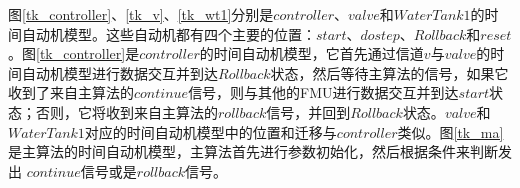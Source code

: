 \begin{figure}[htbp]
\end{figure}

图\ref{tk_controller}、\ref{tk_v}、\ref{tk_wt1}分别是$controller$、$valve$和$WaterTank1$的时间自动机模型。这些自动机都有四个主要的位置：$start$、$dostep$、$Rollback$和$reset$。图\ref{tk_controller}是$controller$的时间自动机模型，它首先通过信道$v$与$valve$的时间自动机模型进行数据交互并到达$Rollback$状态，然后等待主算法的信号，如果它收到了来自主算法的$continue$信号，则与其他的FMU进行数据交互并到达$start$状态；否则，它将收到来自主算法的$rollback$信号，并回到$Rollback$状态。$valve$和$WaterTank1$对应的时间自动机模型中的位置和迁移与$controller$类似。图\ref{tk_ma}是主算法的时间自动机模型，主算法首先进行参数初始化，然后根据条件来判断发出  $continue$信号或是$rollback$信号。

